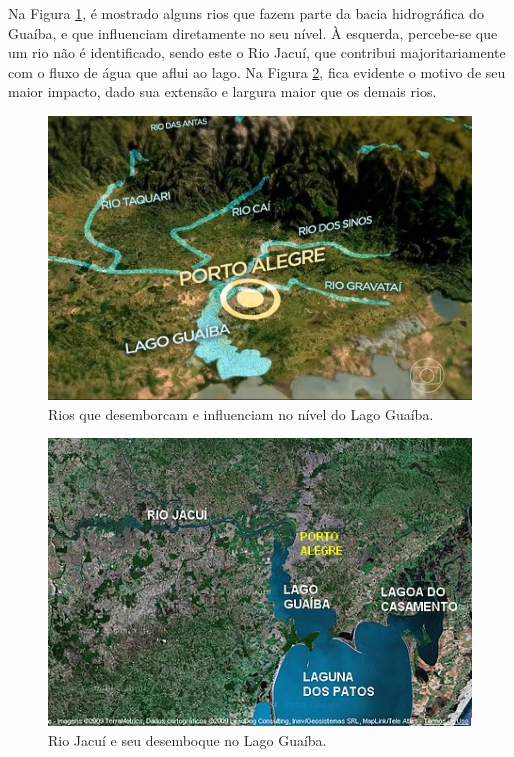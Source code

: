 Na Figura \ref{fig:bacia_guaiba}, é mostrado alguns rios que fazem parte da bacia hidrográfica do Guaíba, e que influenciam diretamente no seu nível. À esquerda, percebe-se que um rio não é identificado, sendo este o Rio Jacuí, que contribui majoritariamente com o fluxo de água que aflui ao lago. Na Figura \ref{fig:bacia_guaiba_2}, fica evidente o motivo de seu maior impacto, dado sua extensão e largura maior que os demais rios. 

\begin{figure}[H]
	\caption{\label{fig:bacia_guaiba}Rios que desemborcam e influenciam no nível do Lago Guaíba.}
	\begin{center}
		\includegraphics[scale=0.4]{figuras/lago_guaiba.jpg}
	\end{center}
\end{figure}

\begin{figure}[H]
	\caption{\label{fig:bacia_guaiba_2}Rio Jacuí e seu desemboque no Lago Guaíba.}
	\begin{center}
		\includegraphics[scale=0.8]{figuras/lago_guaiba_2.jpg}
	\end{center}
\end{figure}


